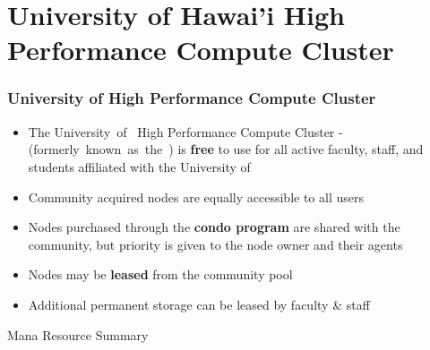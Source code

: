 \section[University of Hawai'i High Performance Compute Cluster]{University of Hawai'i High Performance Compute Cluster}
\begin{frame}
    \frametitle{University of {\hawaii} High Performance Compute Cluster}
    \begin{itemize}
    \item The University~of~{\hawaii} High Performance Compute Cluster - \textbf{\mana} (formerly~known~as~the~{\uhhpc}) is \textbf{free} to use for all active faculty, staff, and students affiliated with the University of {\hawaii}
    \item Community acquired nodes are equally accessible to all users
    \item Nodes purchased through the {\textbf{condo program}} are shared with the community, but priority is given to the node owner and their agents
		\item Nodes may be {\textbf{leased}} from the community pool
		\item Additional permanent storage can be leased by faculty \& staff
    \end{itemize}
		\begin{block}{Mana Resource Summary}
  \begin{table}
    \centering
  \end{table}
	\end{block}
\end{frame}

